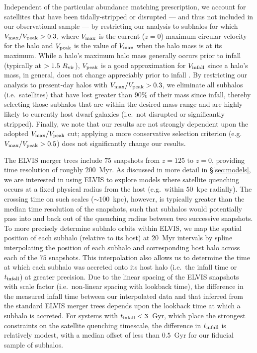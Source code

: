 Independent of the particular abundance matching prescription, we
account for satellites that have been tidally-stripped or disrupted
--- and thus not included in our observational sample --- by
restricting our analysis to subhalos for which $V_{\rm max}/V_{\rm
  peak} > 0.3$, where $V_{\rm max}$ is the current ($z=0$) maximum
circular velocity for the halo and $V_{\rm peak}$ is the value of
$V_{\rm max}$ when the halo mass is at its maximum. While a halo's
maximum halo mass generally occurs prior to infall (typically at $>
1.5~R_{\rm vir}$), $V_{\rm peak}$ is a good approximation for $V_{\rm
  infall}$ since a halo's mass, in general, does not change
appreciably prior to infall \citep{behroozi14}. By restricting our
analysis to present-day halos with $V_{\rm max}/V_{\rm peak} > 0.3$,
we eliminate all subhalos (i.e.~satellites) that have lost greater
than $90\%$ of their mass since infall, thereby selecting those
subhalos that are within the desired mass range and are highly likely
to currently host dwarf galaxies (i.e.~not disrupted or significantly
stripped). Finally, we note that our results are not strongly
dependent upon the adopted $V_{\rm max}/V_{\rm peak}$ cut; applying a
more conservative selection criterion (e.g.~$V_{\rm max}/V_{\rm peak}
> 0.5$) does not significantly change our results.



The ELVIS merger trees include $75$ snapshots from $z = 125$ to $z =
0$, providing time resolution of roughly $200$~Myr. As discussed in
more detail in \S\ref{sec:models}, we are interested in using ELVIS to
explore models where satellite quenching occurs at a fixed physical
radius from the host (e.g.~within $50$~kpc radially). The crossing
time on such scales ($\sim100$~kpc), however, is typically greater
than the median time resolution of the snapshots, such that subhalos
would potentially pass into and back out of the quenching radius
between two successive snapshots. To more precisely determine subhalo
orbits within ELVIS, we map the spatial position of each subhalo
(relative to its host) at $20$~Myr intervals by spline interpolating
the position of each subhalo and corresponding host halo across each
of the $75$ snapshots. This interpolation also allows us to determine
the time at which each subhalo was accreted onto its host halo
(i.e.~the infall time or $t_{\rm infall}$) at greater precision. Due
to the linear spacing of the ELVIS snapshots with scale factor
(i.e.~non-linear spacing with lookback time), the difference in the
measured infall time between our interpolated data and that inferred
from the standard ELVIS merger trees depends upon the lookback time at
which a subhalo is accreted. For systems with $t_{\rm infall} <
3$~Gyr, which place the strongest constraints on the satellite
quenching timescale, the difference in $t_{\rm infall}$ is relatively
modest, with a median offset of less than $0.5$~Gyr for our fiducial
sample of subhalos.


